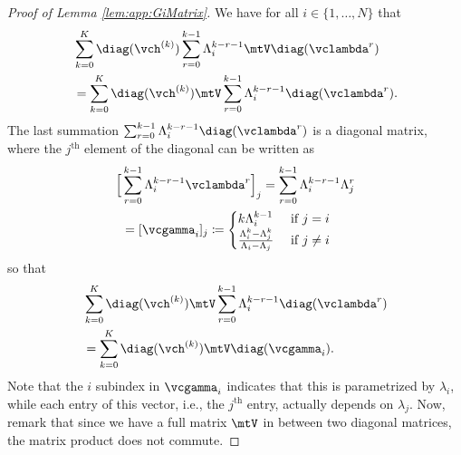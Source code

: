 \begin{proof}[Proof of Lemma \ref{lem:app:GiMatrix}]
We have for all $i\in\{1,\ldots,N\}$ that
%
\begin{equation}\label{eq:app:lemEq1}
%
\begin{aligned}
    & \sum_{k=0}^{K} \diag(\vch^{(k)}) \sum_{r=0}^{k-1}\lambda_{i}^{k-r-1}\mtV \diag(\vclambda^{r}) \\ & = \sum_{k=0}^{K} \diag(\vch^{(k)}) \mtV \sum_{r=0}^{k-1}\lambda_{i}^{k-r-1} \diag(\vclambda^{r}).
\end{aligned}
%
\end{equation}
%
The last summation $\sum_{r=0}^{k-1}\lambda_{i}^{k-r-1} \diag(\vclambda^{r})$ is a diagonal matrix, where the $j^{\text{th}}$ element of the diagonal can be written as
%
\begin{equation}
%
\begin{aligned}
    \Big[& \sum_{r=0}^{k-1} \lambda_{i}^{k-r-1} \vclambda^{r} \Big]_{j} = \sum_{r=0}^{k-1} \lambda_{i}^{k-r-1}\lambda_{j}^{r} \\ & = [\vcgamma_{i}]_{j} \coloneqq \begin{cases}
    k \lambda_{i}^{k-1} & \text{ if } j=i \\
    \frac{\lambda_{i}^{k} - \lambda_{j}^{k}}{\lambda_{i}-\lambda_{j}} & \text{ if } j \neq i
    \end{cases}
\end{aligned}
%
\end{equation}
%
so that
%
\begin{equation}\label{eq:app:lemEq2}
%
\begin{aligned}
    & \sum_{k=0}^{K} \diag(\vch^{(k)}) \mtV \sum_{r=0}^{k-1}\lambda_{i}^{k-r-1} \diag(\vclambda^{r}) \\ & = \sum_{k=0}^{K} \diag(\vch^{(k)}) \mtV \diag(\vcgamma_{i}).
\end{aligned}
%
\end{equation}
%
Note that the $i$ subindex in $\vcgamma_{i}$ indicates that this is parametrized by $\lambda_{i}$, while each entry of this vector, i.e., the $j^{\text{th}}$ entry, actually depends on $\lambda_{j}$. Now, remark that since we have a full matrix $\mtV$ in between two diagonal matrices, the matrix product does not commute.


\end{proof}
